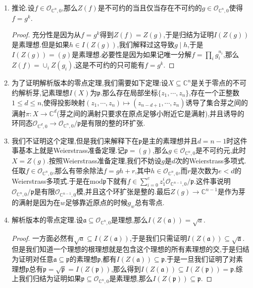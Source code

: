 \begin{enumerate}
\begin{proof}
    	反过来设$I(X)$是素理想,设$X=X_1\cup X_2$,其中$X_1,X_2$是解析芽,假设$X\not=X_1$且$X\not=X_2$,那么$I(X)\subsetneqq I(X_1)$和$I(X)\subsetneqq I(X_2)$,于是可以取$f_1\in I(X_1)-I(X)$和$f_2\in I(X_2)-I(X)$.但是$f_1f_2\in I(X)$,这就和$I(X)$是素理想矛盾.
    \end{proof}
    \item 推论.设$f\in\mathscr{O}_{\mathbb{C}^n,0}$,那么$Z(f)$是不可约的当且仅当存在不可约的$g\in\mathscr{O}_{\mathbb{C}^n,0}$使得$f=g^k$.
    \begin{proof}
    	
    	充分性是因为从$f=g^k$得到$Z(f)=Z(g)$,于是归结为证明$I(Z(g))$是素理想.但是如果$h\in I(Z(g))$,我们解释过这导致$g\mid h$,于是$I(Z(g))=(g)$是素理想.必要性是因为如果记唯一分解$f=\prod_ig_i^{n_i}$,那么$Z(f)=\cup_iZ(g_i)$,这是不可约的只可能有$f=g^k$.
    \end{proof}
    \item 为了证明解析版本的零点定理,我们需要如下定理:设$X\subseteq\mathbb{C}^n$是关于零点的不可约解析芽,记素理想$I(X)$为$\mathfrak{p}$.那么存在局部坐标$\{z_1,\cdots,z_n\}$,存在一个正整数$1\le d\le n$,使得投影映射$(z_1,\cdots,z_n)\mapsto(z_{n-d+1},\cdots,z_n)$诱导了集合芽之间的满射$\pi:X\to\mathbb{C}^d$(芽之间的满射只要求在原点足够小附近它是满射),并且诱导的环同态$\mathscr{O}_{\mathbb{C}^d,0}\to\mathscr{O}_{\mathbb{C}^n,0}/\mathfrak{p}$是有限的整的环扩张.
    \item 我们不证明这个定理,但是我们来解释下在$\mathfrak{p}$是主的素理想并且$d=n-1$时这件事基本上就是Weierstrass准备定理.记$\mathfrak{p}=(g)$,那么$g\in\mathscr{O}_{\mathbb{C}^n,0}$是不可约元,此时$X=Z(g)$.按照Weierstrass准备定理,我们不妨设$g$是$d$次的Weierstrass多项式.任取$f\in\mathscr{O}_{\mathbb{C}^n,0}$,那么有带余除法$f=gh+r$,其中$h\in\mathscr{O}_{\mathbb{C}^n,0}$,而$r$是次数为$e<d$的Weierstrass多项式.于是在$\mathrm{mod}\mathfrak{p}$下就有$f\in\sum_{i=0}^ez_1^i\mathscr{O}_{\mathbb{C}^{n-1},0}/\mathfrak{p}$.这件事说明$\mathscr{O}_{\mathbb{C}^n,0}/\mathfrak{p}$是有限$\mathscr{O}_{\mathbb{C}^{n-1},0}$模,并且这个环扩张是整的.最后$Z(g)\to\mathbb{C}^{n-1}$是作为芽的满射是因为在$w$足够靠近原点的时候$g_w$总有零点.
    \item 解析版本的零点定理.设$\mathfrak{a}\subseteq\mathscr{O}_{\mathbb{C}^n,0}$是理想,那么$I(Z(\mathfrak{a}))=\sqrt{a}$.
    \begin{proof}
    	
    	一方面必然有$\sqrt{a}\subseteq I(Z(\mathfrak{a}))$,于是我们只需证明$I(Z(\mathfrak{a}))\subseteq\sqrt{\mathfrak{a}}$.但是我们知道一个理想的根理想就是包含这个理想的所有素理想的交,于是归结为证明对任意$\mathfrak{a}\subseteq\mathfrak{p}$的素理想$\mathfrak{p}$,都有$I(Z(\mathfrak{a}))\subseteq\mathfrak{p}$.于是一旦我们证明了对素理想$\mathfrak{p}$总有$\mathfrak{p}=\sqrt{\mathfrak{p}}=I(Z(\mathfrak{p}))$,那么得到$I(Z(\mathfrak{a}))\subseteq I(Z(\mathfrak{p}))=\mathfrak{p}$.综上我们归结为证明如果$\mathfrak{p}\subseteq\mathscr{O}_{\mathbb{C}^n,0}$是素理想,那么$I(Z(\mathfrak{p}))\subseteq\mathfrak{p}$.
    	

\end{proof}
\end{enumerate}

